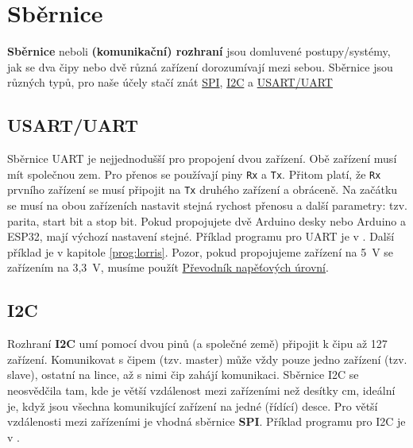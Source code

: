 \section{Sběrnice}


\textbf{Sběrnice}  neboli \textbf{(komunikační) rozhraní} jsou domluvené postupy/systémy, jak se dva čipy nebo dvě různá zařízení dorozumívají mezi sebou. 
Sběrnice jsou různých typů, pro naše účely stačí znát  
\href{https://maly.gitbooks.io/hradla-volty-jednocipy/23_seriova_komunikace/231_seriova_sbernice_spi.html}{SPI}, 
\href{https://maly.gitbooks.io/hradla-volty-jednocipy/23_seriova_komunikace/232_seriova_sbernice_i2c.html}{I2C}  
a \href{https://maly.gitbooks.io/hradla-volty-jednocipy/23_seriova_komunikace/235_rs-232,_uart,_serial.html}{USART/UART}

\subsection{USART/UART} \label{uart}

Sběrnice UART je nejjednodušší pro propojení dvou zařízení. 
Obě zařízení musí mít společnou zem. 
Pro přenos se používají piny \texttt{Rx} a \texttt{Tx}. 
Přitom platí, že \texttt{Rx} prvního zařízení se musí připojit na \texttt{Tx} druhého zařízení a obráceně.  
Na začátku se musí na obou zařízeních nastavit stejná rychost přenosu a další parametry: tzv. parita, start bit a stop bit. 
Pokud propojujete dvě Arduino desky nebo Arduino a ESP32, mají výchozí nastavení stejné. 
Příklad programu pro UART je v \cite[strana~144]{ard}. 
Další příklad je v kapitole \ref{prog:lorris}.
Pozor, pokud propojujeme zařízení na 5~V se zařízením na 3,3~V, musíme použít 
 \hyperref[prevodnik]{Převodník napěťových úrovní}.

\subsection{I2C} \label{i2c} \label{spi}  

Rozhraní \textbf{I2C}  umí pomocí dvou pinů (a společné země) připojit k čipu až 127 zařízení. Komunikovat s čipem (tzv. master) může vždy pouze jedno zařízení (tzv. slave), ostatní  na lince, až s nimi čip zahájí komunikaci. 
Sběrnice I2C se neosvědčila tam, kde je větší vzdálenost mezi zařízeními než desítky cm, ideální je, když jsou všechna komunikující zařízení na jedné (řídící) desce. 
Pro větší vzdálenosti mezi zařízeními je vhodná sběrnice \textbf{SPI}. 
Příklad programu pro I2C je v \cite[strana~152]{ard}.


